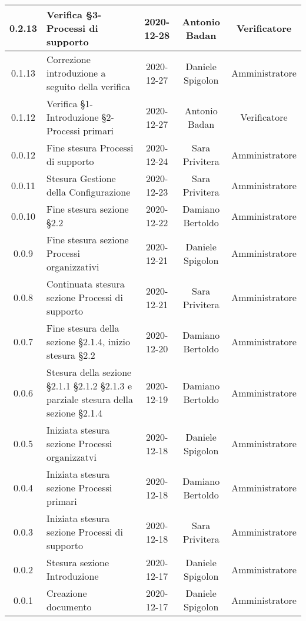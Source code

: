 \begin{center}
\begin{longtable}{|c|p{5cm}|c|c|c|}
	\hline
	0.2.13 & Verifica §3-Processi di supporto  & 2020-12-28 & Antonio Badan & Verificatore \\
	\hline
	0.1.13 & Correzione introduzione a seguito della verifica  & 2020-12-27 & Daniele Spigolon & Amministratore \\
	\hline
	0.1.12 & Verifica §1-Introduzione §2-Processi primari  & 2020-12-27 & Antonio Badan & Verificatore \\
	\hline
	0.0.12 & Fine stesura Processi di supporto & 2020-12-24 & Sara Privitera & Amministratore \\
	\hline
	0.0.11 & Stesura Gestione della Configurazione & 2020-12-23 & Sara Privitera & Amministratore \\
	\hline
	0.0.10 & Fine stesura sezione §2.2 & 2020-12-22 & Damiano Bertoldo & Amministratore \\
	\hline
	0.0.9 & Fine stesura sezione Processi organizzativi & 2020-12-21 & Daniele Spigolon & Amministratore \\
	\hline
	0.0.8 & Continuata stesura sezione Processi di supporto & 2020-12-21 & Sara Privitera & Amministratore \\
	\hline
	0.0.7 & Fine stesura della sezione §2.1.4, inizio stesura §2.2 & 2020-12-20 & Damiano Bertoldo & Amministratore \\
	\hline
	0.0.6 & Stesura della sezione §2.1.1 §2.1.2 §2.1.3 e parziale stesura della sezione §2.1.4 & 2020-12-19 & Damiano Bertoldo & Amministratore \\
	\hline
	0.0.5 & Iniziata stesura sezione Processi organizzatvi & 2020-12-18 & Daniele Spigolon & Amministratore \\
	\hline
	0.0.4 & Iniziata stesura sezione Processi primari & 2020-12-18 & Damiano Bertoldo & Amministratore \\
	\hline
	0.0.3 & Iniziata stesura sezione Processi di supporto & 2020-12-18 & Sara Privitera & Amministratore \\
	\hline
	0.0.2 & Stesura sezione Introduzione & 2020-12-17 & Daniele Spigolon & Amministratore \\
	\hline
	0.0.1 & Creazione documento & 2020-12-17 & Daniele Spigolon & Amministratore \\
	\hline
	
	

	\end{longtable}
\end{center}
